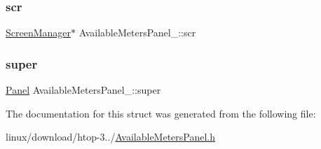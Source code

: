 \subsubsection{\texorpdfstring{scr}{scr}}
{\footnotesize\ttfamily \hyperlink{ScreenManager_8h_a798c9c69dc8024a4c6829982bf94dddd}{Screen\+Manager}$\ast$ Available\+Meters\+Panel\+\_\+\+::scr}

\mbox{\label{structAvailableMetersPanel___a96b169ffe77fd5e14f72d8d529bcfb9e}} 
\subsubsection{\texorpdfstring{super}{super}}
{\footnotesize\ttfamily \hyperlink{Panel_8h_a034d4c16521db412dc7a1e8536d16fae}{Panel} Available\+Meters\+Panel\+\_\+\+::super}



The documentation for this struct was generated from the following file\+:\begin{DoxyCompactItemize}
\item 
linux/download/htop-\/3../\hyperlink{AvailableMetersPanel_8h}{Available\+Meters\+Panel.\+h}\end{DoxyCompactItemize}
